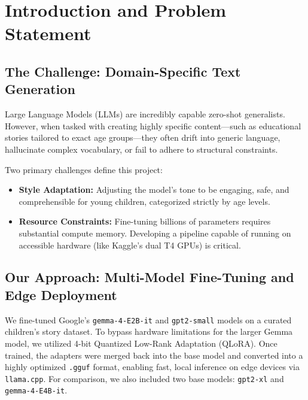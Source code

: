 \documentclass{article}
\begin{document}
\newpage
\pagestyle{fancy}
\fancyhf{}
\fancyhead[R]{\thepage}

\tableofcontents
\newpage
\listoffigures
\newpage


\section{Introduction and Problem Statement}
\label{sec:intro}

\subsection{The Challenge: Domain-Specific Text Generation}
Large Language Models (LLMs) are incredibly capable zero-shot generalists. However, when tasked with creating highly specific content—such as educational stories tailored to exact age groups—they often drift into generic language, hallucinate complex vocabulary, or fail to adhere to structural constraints.

Two primary challenges define this project:
\begin{itemize}[noitemsep, topsep=0pt]
    \item \textbf{Style Adaptation:} Adjusting the model's tone to be engaging, safe, and comprehensible for young children, categorized strictly by age levels.
    \item \textbf{Resource Constraints:} Fine-tuning billions of parameters requires substantial compute memory. Developing a pipeline capable of running on accessible hardware (like Kaggle's dual T4 GPUs) is critical.
\end{itemize}

\subsection{Our Approach: Multi-Model Fine-Tuning and Edge Deployment}
We fine-tuned Google's \texttt{gemma-4-E2B-it} and \texttt{gpt2-small} models on a curated children's story dataset. To bypass hardware limitations for the larger Gemma model, we utilized 4-bit Quantized Low-Rank Adaptation (QLoRA). Once trained, the adapters were merged back into the base model and converted into a highly optimized \texttt{.gguf} format, enabling fast, local inference on edge devices via \texttt{llama.cpp}. For comparison, we also included two base models: \texttt{gpt2-xl} and \texttt{gemma-4-E4B-it}.
\end{document}
